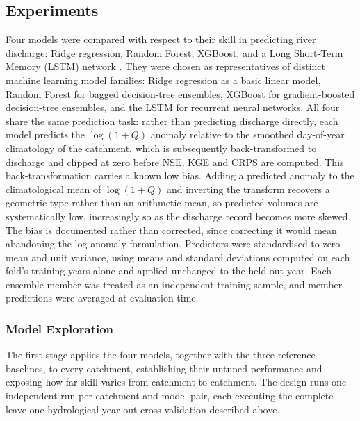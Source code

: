 \documentclass[review,12pt,authoryear]{elsarticle}
\begin{document}
\subsection{Experiments}

Four models were compared with respect to their skill in predicting river discharge: Ridge regression, Random Forest, XGBoost, and a Long Short-Term Memory (LSTM) network \citep{hochreiter1997}. They were chosen as representatives of distinct machine learning model families: Ridge regression as a basic linear model, Random Forest for bagged decision-tree ensembles, XGBoost for gradient-boosted decision-tree ensembles, and the LSTM for recurrent neural networks. All four share the same prediction task: rather than predicting discharge directly, each model predicts the $\log(1+Q)$ anomaly relative to the smoothed day-of-year climatology of the catchment, which is subsequently back-transformed to discharge and clipped at zero before NSE, KGE and CRPS are computed. This back-transformation carries a known low bias. Adding a predicted anomaly to the climatological mean of $\log(1+Q)$ and inverting the transform recovers a geometric-type rather than an arithmetic mean, so predicted volumes are systematically low, increasingly so as the discharge record becomes more skewed. The bias is documented rather than corrected, since correcting it would mean abandoning the log-anomaly formulation. Predictors were standardised to zero mean and unit variance, using means and standard deviations computed on each fold's training years alone and applied unchanged to the held-out year. Each ensemble member was treated as an independent training sample, and member predictions were averaged at evaluation time.

  \subsubsection{Model Exploration}

The first stage applies the four models, together with the three reference baselines, to every catchment, establishing their untuned performance and exposing how far skill varies from catchment to catchment. The design runs one independent run per catchment and model pair, each executing the complete leave-one-hydrological-year-out cross-validation described above.
\end{document}
